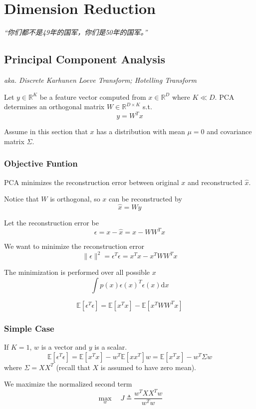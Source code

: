 \chapter{Dimension Reduction}
\emph{“你们都不是49年的国军，你们是50年的国军。”}
\newpage


\section{Principal Component Analysis}
    \emph{aka. Discrete Karhunen Loeve Transform; Hotelling Transform}

    Let $y \in \mathbb{R}^K$ be a feature vector computed from $x \in \mathbb{R}^D$ where $K \ll D$. PCA determines an orthogonal matrix $W \in \mathbb{R}^{D \times K}$ s.t.
    \[ y = W^Tx \]

    Assume in this section that $x$ has a distribution with mean $\mu=0$ and covariance matrix $\Sigma$.

    \subsection{Objective Funtion}
        PCA minimizes the reconstruction error between original $x$ and reconstructed $\hat{x}$.

        Notice that $W$ is orthogonal, so $x$ can be reconstructed by
        \[ \hat{x} = Wy \]

        Let the reconstruction error be
        \[ \epsilon = x - \hat{x} = x - WW^Tx \]

        We want to minimize the reconstruction error
        \[ \|\epsilon\|^2 = \epsilon^T\epsilon = x^Tx - x^TWW^Tx \]

        The minimization is performed over all possible $x$
        \[ \int p(x)\epsilon(x)^T\epsilon(x)\mathrm{d}x \]

        \[ \mathbb{E}[\epsilon^T\epsilon] = \mathbb{E}[x^Tx] - \mathbb{E}[x^TWW^Tx]\]

    \subsection{Simple Case}
        If $K=1$, $w$ is a vector and $y$ is a scalar.
        \[\mathbb{E}[\epsilon^T\epsilon] = \mathbb{E}[x^Tx]-w^T\mathbb{E}[xx^T]w = \mathbb{E}[x^Tx] - w^T \Sigma w\]
        where $\Sigma = XX^T$ (recall that $X$ is assumed to have zero mean).

        We maximize the normalized second term
        \[ \max_w \quad J \triangleq \frac{w^TXX^Tw}{w^Tw} \]

